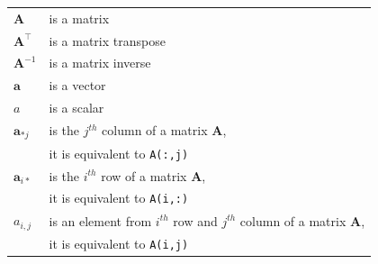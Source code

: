 \documentclass[10pt,twocolumn]{article}
\begin{document}
\begin{tabular}{ll}
    $\mathbf{A}$ & is a matrix \\
     $\mathbf{A}^{\top}$ & is a matrix transpose \\
     $\mathbf{A}^{-1}$ & is a matrix inverse \\
     $\mathbf{a}$ & is a vector \\
     $a$ & is a scalar \\
    $\mathbf{a}_{*j}$ & is the $j^{th}$ column of a matrix $\mathbf{A}$, \\
    & it is equivalent to \texttt{A(:,j)} \\
    $\mathbf{a}_{i*}$ & is the $i^{th}$ row of a matrix $\mathbf{A}$, \\
    & it is equivalent to \texttt{A(i,:)} \\
    $a_{i,j}$ & is an element from $i^{th}$ row and $j^{th}$ column of a matrix $\mathbf{A}$, \\ 
    & it is equivalent to  \texttt{A(i,j)} \\
\end{tabular}

%
%
%
%
%
%
%

\newpage
\end{document}
